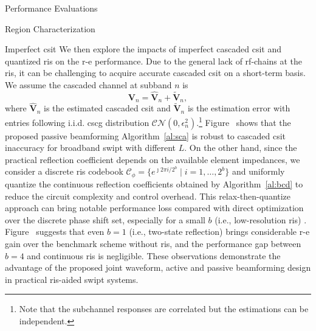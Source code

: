 \begin{section}{Performance Evaluations}
\begin{subsection}{ Region Characterization}
\begin{subsubsection}{Imperfect \gls{csit}}
			We then explore the impacts of imperfect cascaded \gls{csit} and quantized \gls{ris} on the \gls{r-e} performance. Due to the general lack of \gls{rf}-chains at the \gls{ris}, it can be challenging to acquire accurate cascaded \gls{csit} on a short-term basis. We assume the cascaded channel at subband $n$ is
			\begin{equation}
				\mathbf{V}_{n} = \hat{\mathbf{V}}_{n} + \tilde{\mathbf{V}}_{n},
			\end{equation}
			where $\hat{\mathbf{V}}_{n}$ is the estimated cascaded \gls{csit} and $\tilde{\mathbf{V}}_{n}$ is the estimation error with entries following i.i.d. \gls{cscg} distribution $\mathcal{CN}(0, \epsilon_{n}^2)$.\footnote{Note that the subchannel responses are correlated but the estimations can be independent.} Figure~ shows that the proposed passive beamforming Algorithm~\ref{al:sca} is robust to cascaded \gls{csit} inaccuracy for broadband \gls{swipt} with different $L$. On the other hand, since the practical reflection coefficient depends on the available element impedances, we consider a discrete \gls{ris} codebook $\mathcal{C}_\phi = \{e^{\jmath 2 \pi i / 2^b} \mid i = 1, \dots, 2^b\}$ and uniformly quantize the continuous reflection coefficients obtained by Algorithm~\ref{al:bcd} to reduce the circuit complexity and control overhead. This relax-then-quantize approach can bring notable performance loss compared with direct optimization over the discrete phase shift set, especially for a small $b$ (i.e., low-resolution \gls{ris}) \cite{Wu2020c}. Figure~ suggests that even $b=1$ (i.e., two-state reflection) brings considerable \gls{r-e} gain over the benchmark scheme without \gls{ris}, and the performance gap between $b=4$ and continuous \gls{ris} is negligible. These observations demonstrate the advantage of the proposed joint waveform, active and passive beamforming design in practical \gls{ris}-aided \gls{swipt} systems.
		\end{subsubsection}
	\end{subsection}
\end{section}


